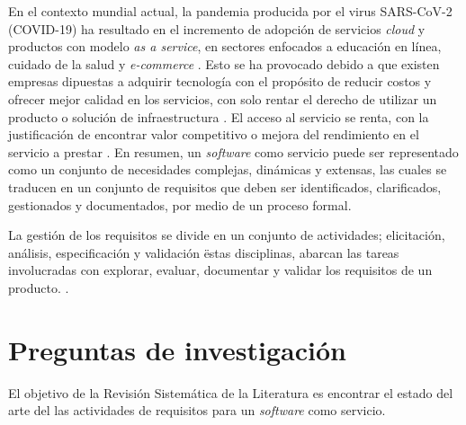 \documentclass{article}
\begin{document}
En el contexto mundial actual, la pandemia producida por el virus SARS-CoV-2 (COVID-19) ha resultado en el incremento de  adopción de servicios \emph{cloud} y 
productos con modelo \emph{as a service}, en sectores enfocados a educación en línea, cuidado de la salud y \emph{e-commerce} \cite{value:online} .
Esto se ha provocado debido a que existen empresas dipuestas a adquirir tecnología con el propósito de reducir costos y ofrecer mejor calidad en los
servicios, con solo rentar el derecho de utilizar un producto o solución de infraestructura \cite{Wu2011}.
El acceso al servicio se renta, con la justificación de encontrar valor competitivo o mejora del rendimiento en el servicio a prestar \cite{oliveira20191}.
En resumen, un \emph{software} como servicio puede ser representado como un conjunto de necesidades complejas, dinámicas y extensas, 
las cuales se traducen en un conjunto de requisitos que deben ser identificados, clarificados, 
gestionados y documentados, por medio de un proceso formal. 

La gestión de los requisitos se divide en un conjunto de actividades; elicitación, análisis, especificación y validación \cite{abran2004software}
ëstas disciplinas, abarcan las tareas involucradas con explorar, evaluar, documentar y validar los requisitos de un producto. \cite[p.15]{2543993}.








\newpage

\section{Preguntas de investigación}\label{pi}
El objetivo de la Revisión Sistemática de la Literatura es encontrar el estado del arte del las actividades de requisitos para un \emph{software} como servicio. 
\end{document}
